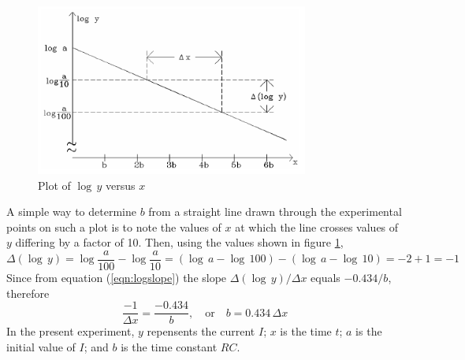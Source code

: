 \begin{figure}[h]
    \begin{center}
        \includegraphics[width=0.8\textwidth]{./Exp3/pic/image5.png}
    \end{center}
    \caption{Plot of $\log\,y$ versus $x$}
    \label{fig:logplot}
\end{figure}

A simple way to determine $b$ from a straight line drawn through the experimental points on such a plot is to note the values of $x$ at which the line crosses values of $y$ differing by a factor of 10. Then, using the values shown in figure \ref{fig:logplot},
\begin{equation}
    \Delta(\log\,y) = \log\frac{a}{100} - \log\frac{a}{10} = (\log\,a - \log\,100) - (\log\,a - \log\,10) = -2+1 = -1
\end{equation}
Since from equation (\ref{eqn:logslope}) the slope $\Delta(\log\,y)/\Delta x$ equals $-0.434/b$, therefore
\begin{equation}
    \frac{-1}{\Delta x} = \frac{-0.434}{b},\quad\text{or}\quad b = 0.434\,\Delta x
\end{equation}
In the present experiment, $y$ repensents the current $I$; $x$ is the time $t$; $a$ is the initial value of $I$; and $b$ is the time constant $RC$. \myskip

